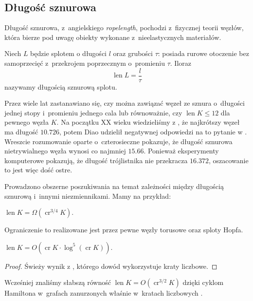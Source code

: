\subsection{Długość sznurowa} %
\label{sub:ropelength}
Długość sznurowa, z~angielskiego \emph{ropelength}, pochodzi z~fizycznej teorii węzłów, która bierze pod uwagę obiekty wykonane z~nieelastycznych materiałów.

\begin{definition}
	Niech $L$ będzie splotem o długości $l$ oraz grubości $\tau$: posiada rurowe otoczenie bez samoprzecięć z~przekrojem poprzecznym o~promieniu $\tau$.
	Iloraz
	\begin{equation}	
		\operatorname{len} L = \frac l \tau
	\end{equation}
	nazywamy długością sznurową splotu.
\end{definition}

Przez wiele lat zastanawiano się, czy można zawiązać węzeł ze sznura o~długości jednej stopy i~promieniu jednego cala lub równoważnie, czy $\operatorname{len} K \le 12$ dla pewnego węzła $K$.
Na początku XX wieku wiedzieliśmy z \cite{cantarella02}, że najkrótszy węzeł ma długość $10.726$, potem Diao udzielił negatywnej odpowiedzi na to pytanie w \cite{diao03}.
Wreszcie rozumowanie \cite{denne06} oparte o~czterosieczne pokazuje, że długość sznurowa nietrywialnego węzła wynosi co najmniej $15.66$.
Ponieważ eksperymenty komputerowe pokazują, że długość trójlistnika nie przekracza $16.372$, oszacowanie to jest więc dość ostre.


Prowadzono obszerne poszukiwania na temat zależności między długością sznurową i~innymi niezmiennikami.
Mamy na przykład:

\begin{proposition}
	$\operatorname{len} K = \Omega (\operatorname{cr}^{3/4} K)$.
\end{proposition}

Ograniczenie to realizowane jest przez pewne węzły torusowe oraz sploty Hopfa.

\begin{proposition}
	$\operatorname{len} K = O(\operatorname{cr} K \cdot \log^5(\operatorname{cr} K)).$
\end{proposition}

\begin{proof}
	Świeży wynik z \cite{diao19}, którego dowód wykorzystuje kraty liczbowe.
\end{proof}

Wcześniej znaliśmy słabszą równość $\operatorname{len} K = O(\operatorname{cr}^{3/2} K)$ dzięki cyklom Hamiltona w~grafach zanurzonych właśnie w~kratach liczbowych \cite{yu04}.

